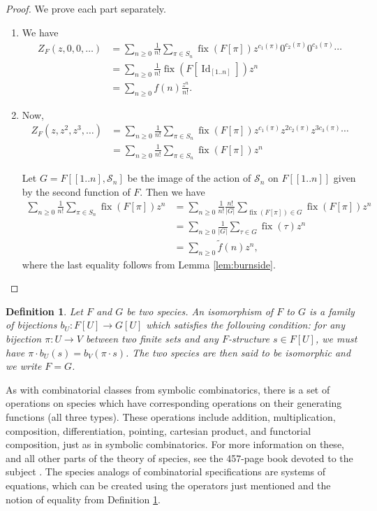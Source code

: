 \documentclass[12pt]{article}
\theoremstyle{plain}
\newtheorem{defin}{Definition}
\DeclareMathOperator{\fix}{fix}
\DeclareMathOperator{\Id}{Id}
\begin{document}
\begin{proof}We prove each part separately.
\begin{enumerate}

 \item We have
\begin{align*}
 Z_F(z,0,0,\dots) &= \sum_{n \geq 0}\frac{1}{n!}  \sum_{\pi \in S_n} \fix(F[\pi]) z^{c_1(\pi)}  0^{c_2(\pi)} 0^{c_3(\pi)} \cdots  \\
&= \sum_{n \geq 0} \frac{1}{n!} \fix(F[\Id_{[1..n]}]) z^n \\
&= \sum_{n \geq 0}  f(n) \frac{z^n}{n!}.
\end{align*}

 \item Now,
\begin{align*}
 Z_F(z, z^2, z^3, \dots ) &= \sum_{n \geq 0}\frac{1}{n!}  \sum_{\pi \in S_n} \fix(F[\pi]) z^{c_1(\pi)}  z^{2 c_2(\pi)} z^{3 c_3(\pi)} \cdots  \\
&= \sum_{n \geq 0}\frac{1}{n!}  \sum_{\pi \in S_n} \fix(F[\pi]) z^n
\end{align*}

Let \( G = F[[1..n], \mathcal{S}_n] \) be the image of the action of \( \mathcal{S}_n \) on \(F[[1..n]] \) given by the second function of \( F \).
Then we have
\begin{align*}
\sum_{n \geq 0}\frac{1}{n!}  \sum_{\pi \in S_n} \fix(F[\pi]) z^n &= \sum_{n \geq 0}\frac{1}{n!}  \frac{n!}{|G|} \sum_{\fix(F[\pi]) \in G} \fix(F[\pi]) z^n \\
&= \sum_{n \geq 0}\frac{1}{|G|} \sum_{\tau \in G} \fix(\tau) z^n \\
&= \sum_{n \geq 0} \tilde{f}(n) z^n,
\end{align*}
where the last equality follows from Lemma \ref{lem:burnside}. \qedhere
\end{enumerate}
\end{proof}

\begin{defin}
\label{defin:speciesequality}
Let \(F\) and \(G\) be two species.
An \emph{isomorphism} of \(F\) to \(G\) is a family of bijections \( b_U : F[U] \rightarrow G[U] \) which satisfies the following condition:
for any bijection \( \pi : U \rightarrow V \) between two finite sets and any \( F \)-structure \(s \in F[U] \), we must have \( \pi \cdot b_U(s) = b_V(\pi \cdot s) \).
The two species are then said to be \emph{isomorphic} and we write \(F = G \).
\end{defin}

As with combinatorial classes from symbolic combinatorics, there is a set of operations on species which have corresponding operations on their generating functions (all three types).
These operations include addition, multiplication, composition, differentiation,
pointing, cartesian product, and functorial composition, just as in symbolic combinatorics.
For more information on these, and all other parts of the theory of species, see the 457-page book devoted to the subject \cite{speciesbook}.
The species analogs of combinatorial specifications are systems of equations, which can be created using the operators just mentioned and the notion of equality from Definition \ref{defin:speciesequality}.
\end{document}
